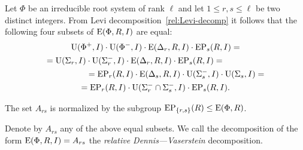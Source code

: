 Let $\Phi$ be an irreducible root system of rank $\ell$ and let $1\leq r,s \leq \ell$ be two distinct integers.
From Levi decomposition~\ref{rel:Levi-decomp} it follows that the following four subsets of $\operatorname{E}(\Phi, R, I)$ are equal:
\begin{multline*}
\operatorname{U}(\Phi^+, I)\cdot \operatorname{U}(\Phi^-, I) \cdot \operatorname{E}(\Delta_r, R, I) \cdot \operatorname{EP}_s(R, I) = \\
= \operatorname{U}(\Sigma_r, I)\cdot \operatorname{U}(\Sigma^-_r, I) \cdot \operatorname{E}(\Delta_r, R, I) \cdot \operatorname{EP}_s(R, I) = \hspace{5em} \\
\hspace{5em} = \operatorname{EP}_r(R, I) \cdot \operatorname{E}(\Delta_s, R, I) \cdot \operatorname{U}(\Sigma_s^-, I)\cdot \operatorname{U}(\Sigma_s, I) = \\
= \operatorname{EP}_r(R, I) \cdot \operatorname{U}(\Sigma^-_r\cap \Sigma^-_s, I) \cdot \operatorname{EP}_s(R, I).
\end{multline*}

\begin{lemma}\label{lemma:dv-normal} The set $A_{rs}$ is normalized by the subgroup $\operatorname{EP}_{\{r,s\}}(R) \leq \operatorname{E}(\Phi, R)$. \end{lemma}



\begin{dfn}
 Denote by $A_{rs}$ any of the above equal subsets.
 We call the decomposition of the form $\operatorname{E}(\Phi, R, I) = A_{rs}$ the {\it relative Dennis---Vaserstein} decomposition.
\end{dfn}

